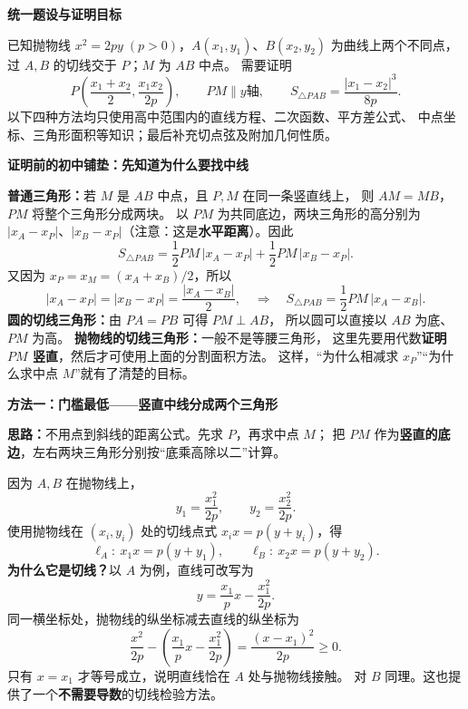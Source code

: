 \begin{proofbox}
    \textbf{\textcolor{CProof}{统一题设与证明目标}}

    已知抛物线 $x^2=2py\;(p>0)$，$A(x_1,y_1)$、$B(x_2,y_2)$ 为曲线上两个不同点，
    过 $A,B$ 的切线交于 $P$；$M$ 为 $AB$ 中点。
    需要证明
    \[
        P\left(\frac{x_1+x_2}{2},\frac{x_1x_2}{2p}\right),\qquad
        PM\parallel y\text{轴},\qquad
        S_{\triangle PAB}=\frac{|x_1-x_2|^3}{8p}.
    \]
    以下四种方法均只使用高中范围内的直线方程、二次函数、平方差公式、
    中点坐标、三角形面积等知识；最后补充切点弦及附加几何性质。

    \medskip

    \textbf{\textcolor{CProof}{证明前的初中铺垫：先知道为什么要找中线}}

    \textbf{普通三角形：}若 $M$ 是 $AB$ 中点，且 $P,M$ 在同一条竖直线上，
    则 $AM=MB$，$PM$ 将整个三角形分成两块。
    以 $PM$ 为共同底边，两块三角形的高分别为
    $|x_A-x_P|$、$|x_B-x_P|$（注意：这是\textbf{水平距离}）。因此
    \[
        S_{\triangle PAB}
        =\frac12 PM\,|x_A-x_P|+\frac12 PM\,|x_B-x_P|.
    \]
    又因为 $x_P=x_M=(x_A+x_B)/2$，所以
    \[
        |x_A-x_P|=|x_B-x_P|=\frac{|x_A-x_B|}{2},
        \quad\Longrightarrow\quad
        \boxed{S_{\triangle PAB}=\frac12 PM\,|x_A-x_B|}.
    \]
    \textbf{圆的切线三角形：}由 $PA=PB$ 可得 $PM\perp AB$，
    所以圆可以直接以 $AB$ 为底、$PM$ 为高。
    \textbf{抛物线的切线三角形：}一般不是等腰三角形，
    这里先要用代数\textbf{证明 $PM$ 竖直}，然后才可使用上面的分割面积方法。
    这样，“为什么相减求 $x_P$”“为什么求中点 $M$”就有了清楚的目标。

    \medskip

    \par\noindent\begin{minipage}{\linewidth}
    \textbf{\textcolor{CProof}{方法一：门槛最低——竖直中线分成两个三角形}}

    
    \end{minipage}\par

    \textbf{思路：}不用点到斜线的距离公式。先求 $P$，再求中点 $M$；
    把 $PM$ 作为\textbf{竖直的底边}，左右两块三角形分别按“底乘高除以二”计算。

    \begin{description}[style=nextline, leftmargin=2.8em, labelsep=0.5em, itemsep=0.55em]
        \item[\textbf{第一步（写出两条切线）：}]
        因为 $A,B$ 在抛物线上，
        \[
            y_1=\frac{x_1^2}{2p},\qquad y_2=\frac{x_2^2}{2p}.
        \]
        使用抛物线在 $(x_i,y_i)$ 处的切线点式 $x_ix=p(y+y_i)$，得
        \[
            \ell_A:\ x_1x=p(y+y_1),\qquad
            \ell_B:\ x_2x=p(y+y_2).
        \]
        \textbf{为什么它是切线？}以 $A$ 为例，直线可改写为
        \[
            y=\frac{x_1}{p}x-\frac{x_1^2}{2p}.
        \]
        同一横坐标处，抛物线的纵坐标减去直线的纵坐标为
        \[
            \frac{x^2}{2p}-\left(\frac{x_1}{p}x-\frac{x_1^2}{2p}\right)
            =\frac{(x-x_1)^2}{2p}\ge 0.
        \]
        只有 $x=x_1$ 才等号成立，说明直线恰在 $A$ 处与抛物线接触。
        对 $B$ 同理。这也提供了一个\textbf{不需要导数}的切线检验方法。


\end{description}
\end{proofbox}
